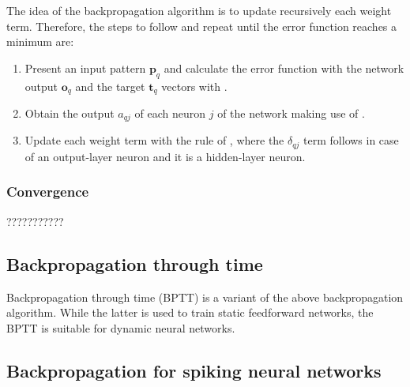 The idea of the backpropagation algorithm is to update recursively each weight term.
Therefore, the steps to follow and repeat until the error function reaches a minimum are:
\begin{enumerate}
\item Present an input pattern $\mathbf{p}_{q}$ and calculate the error function with the network output $\mathbf{o}_{q}$ and the target $\mathbf{t}_{q}$ vectors with .
\item Obtain the output $a_{qj}$ of each neuron $j$ of the network making use of .
\item Update each weight term with the rule of , where the $\delta_{qj}$ term follows  in case of an output-layer neuron and  it is a hidden-layer neuron.
\end{enumerate}


\subsubsection{Convergence}
\label{subsubsec:backpropconvergence}
???????????


\subsection{Backpropagation through time}
\label{subsec:bptt}
Backpropagation through time (BPTT) is a variant of the above backpropagation algorithm. While the latter is used to train static feedforward networks, the BPTT is suitable for dynamic neural networks.

\subsection{Backpropagation for spiking neural networks}
\label{subsec:snnbackprop}
